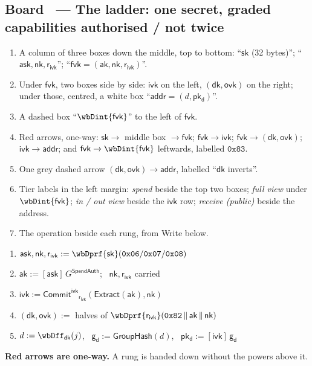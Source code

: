 \documentclass[11pt,a4paper]{article}
\makeatletter
\newcommand{\gd}{\ensuremath{\mathsf{g_d}}}
\newcommand{\pkd}{\ensuremath{\mathsf{pk_d}}}
\newcommand{\aksym}{\ensuremath{\mathsf{ak}}}
\newcommand{\nksym}{\ensuremath{\mathsf{nk}}}
\newcommand{\asksym}{\ensuremath{\mathsf{ask}}}
\newcommand{\ivk}{\ensuremath{\mathsf{ivk}}}
\newcommand{\fvk}{\ensuremath{\mathsf{fvk}}}
\newcommand{\ovk}{\ensuremath{\mathsf{ovk}}}
\newcommand{\dk}{\ensuremath{\mathsf{dk}}}
\newcommand{\rivk}{\ensuremath{\mathsf{r_{ivk}}}}
\newcommand{\Extract}{\ensuremath{\mathsf{Extract}}}
\newcommand{\GroupHash}{\ensuremath{\mathsf{GroupHash}}}
\newcommand{\CommitIvk}{\ensuremath{\mathsf{Commit}^{\mathsf{ivk}}}}
\newcounter{board}
\newenvironment{board}[2]{\stepcounter{board}%
  \subsection*{Board \theboard\ --- #1 \hfill {\normalfont\small\color{arb}#2}}}{\medskip}
\newcommand{\Draw}{\draw@head{Draw}}
\newcommand{\Write}{\draw@head{Write}}
\newcommand{\Say}{\draw@head{Say}}
\makeatother
\begin{document}
\begin{board}{The ladder: one secret, graded capabilities}
  {authorised / not twice}
\xdef\wbDLadderBoard{\theboard}%
\Draw
\begin{enumerate}
  \item A column of three boxes down the middle, top to bottom:
    ``$\mathsf{sk}$ (32 bytes)''; ``$\asksym, \nksym, \rivk$'';
    ``$\fvk = (\aksym, \nksym, \rivk)$''.
  \item Under \fvk, two boxes side by side: \ivk{} on the left,
    $(\dk, \ovk)$ on the right; under those, centred, a white box
    ``$\mathsf{addr} = (d, \pkd)$''.
  \item A dashed box ``$\wbDint{\fvk}$'' to the left of \fvk.
  \item Red arrows, one-way: $\mathsf{sk} \to$ middle box $\to \fvk$;
    $\fvk \to \ivk$; $\fvk \to (\dk, \ovk)$; $\ivk \to \mathsf{addr}$;
    and $\fvk \to \wbDint{\fvk}$ leftwards, labelled $\mathtt{0x83}$.
  \item One grey dashed arrow $(\dk, \ovk) \to \mathsf{addr}$, labelled
    ``\dk{} inverts''.
  \item Tier labels in the left margin: \emph{spend} beside the top two
    boxes; \emph{full view} under $\wbDint{\fvk}$; \emph{in / out view}
    beside the \ivk{} row; \emph{receive (public)} beside the address.
  \item The operation beside each rung, from Write below.
\end{enumerate}
\begin{center}
\resizebox{0.6\textwidth}{!}{\wbDLadderFig}
\end{center}
\Write
\begin{enumerate}
  \item $\asksym, \nksym, \rivk := \wbDprf{\mathsf{sk}}
    (\mathtt{0x06} / \mathtt{0x07} / \mathtt{0x08})$
  \item $\aksym := [\asksym]\,G^{\mathsf{SpendAuth}}$; \ $\nksym, \rivk$
    carried
  \item $\ivk := \CommitIvk_{\rivk}(\Extract(\aksym), \nksym)$
  \item $(\dk, \ovk) :=$ halves of
    $\wbDprf{\rivk}(\mathtt{0x82}\,\|\,\aksym\,\|\,\nksym)$
  \item $d := \wbDff_{\dk}(j)$, \ $\gd := \GroupHash(d)$, \
    $\pkd := [\ivk]\,\gd$
\end{enumerate}
\Say
\textbf{Red arrows are one-way.} A rung is handed down without the powers
above it.


\end{board}
\end{document}
